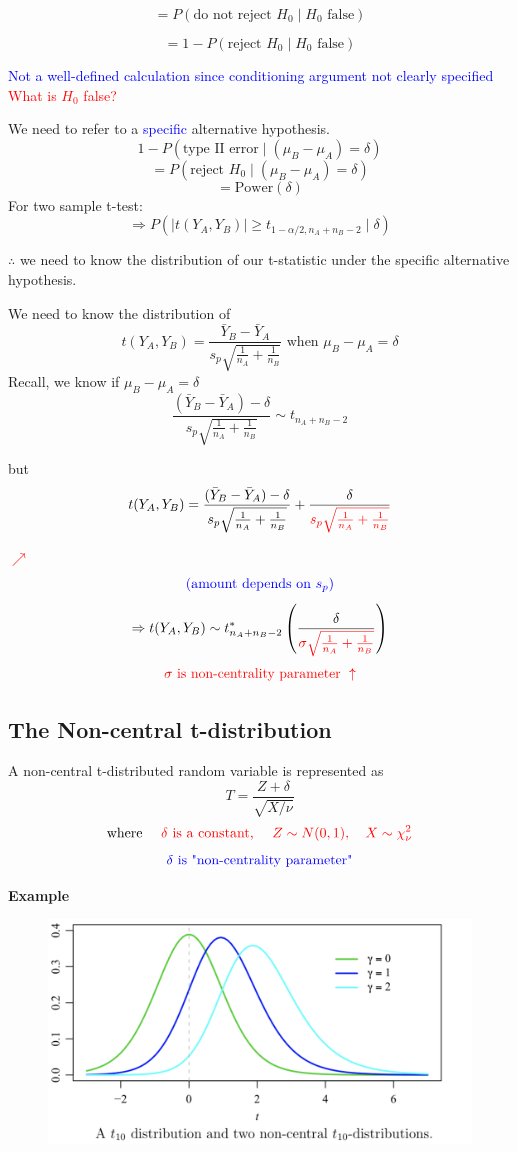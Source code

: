 \documentclass[14pt]{extarticle}
\begin{document}
\[
= P(\text{do not reject } H_0 \mid H_0 \text{ false})
\]

\[
= 1 - P(\text{reject } H_0 \mid H_0 \text{ false})
\]

\noindent \textcolor{blue}{Not a well-defined calculation since conditioning argument not clearly specified} \textcolor{red}{What is $H_0$ false?}

\noindent We need to refer to a \textcolor{blue}{specific} alternative hypothesis.
\[
1 - P(\text{type II error} \mid (\mu_B - \mu_A) = \delta)
\]
\[
= P(\text{reject } H_0 \mid (\mu_B - \mu_A) = \delta)
\]
\[
= \text{Power}(\delta)
\]
For two sample t-test:
\[
\Rightarrow P\left( |t(Y_A, Y_B)| \geq t_{1-\alpha/2, n_A+n_B-2} \mid \delta \right)
\]

\noindent $\therefore$ we need to know the distribution of our t-statistic under the specific alternative hypothesis.

\noindent We need to know the distribution of
\[
t(Y_A, Y_B) = \frac{\bar{Y}_B - \bar{Y}_A}{s_p \sqrt{\frac{1}{n_A} + \frac{1}{n_B}}} \text{ when } \mu_B - \mu_A = \delta
\]
Recall, we know if \(\mu_B - \mu_A = \delta\)
\[
\frac{(\bar{Y}_B - \bar{Y}_A) - \delta}{s_p \sqrt{\frac{1}{n_A} + \frac{1}{n_B}}} \sim t_{n_A + n_B - 2}
\]

but
\[
t(Y_A, Y_B) = \frac{(\bar{Y}_B - \bar{Y}_A) - \delta}{s_p \sqrt{\frac{1}{n_A} + \frac{1}{n_B}}} + \frac{\delta}{\textcolor{red}{s_p \sqrt{\frac{1}{n_A} + \frac{1}{n_B}}}}
\]

\textcolor{red}{$\nearrow$}
\[\textcolor{blue}{\text{(amount depends on } s_p )}\]
\[
\Rightarrow t(Y_A, Y_B) \sim t^*_{n_A + n_B - 2} \left( \frac{\delta}{\textcolor{red}{\sigma \sqrt{\frac{1}{n_A} + \frac{1}{n_B}}}} \right)
\]
\[
\textcolor{red}{\sigma \text{ is non-centrality parameter } \uparrow}
\]

\subsection*{The Non-central t-distribution}
A non-central t-distributed random variable is represented as
\[
T = \frac{Z + \delta}{\sqrt{X / \nu}}
\]
\[
\text{where }\quad
\textcolor{red}{\delta \text{ is a constant, } \quad Z \sim N(0, 1), \quad X \sim \chi^2_\nu}
\]
\[\textcolor{blue}{\delta \text{ is "non-centrality parameter"}}\]

\textbf{Example}
\begin{figure}[h]
    \centering
    \includegraphics[width=1\textwidth]{fig1.png}
\end{figure}
\end{document}
